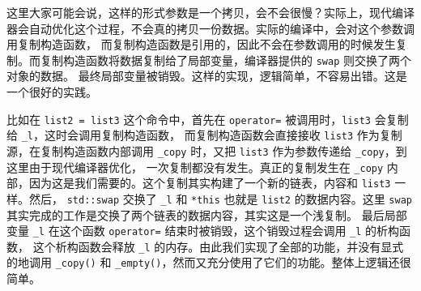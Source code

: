 \documentclass[a4paper]{ctexart}
\theoremstyle{definition}
\theoremstyle{definition}
\begin{document}
这里大家可能会说，这样的形式参数是一个拷贝，会不会很慢？实际上，现代编译器会自动优化这个过程，不会真的拷贝一份数据。实际的编译中，会对这个参数调用复制构造函数，
而复制构造函数是引用的，因此不会在参数调用的时候发生复制。而复制构造函数将数据复制给了局部变量，编译器提供的 \verb|swap| 则交换了两个对象的数据。
最终局部变量被销毁。这样的实现，逻辑简单，不容易出错。这是一个很好的实践。

比如在 \verb|list2 = list3| 这个命令中，首先在 \verb|operator=| 被调用时，\verb|list3| 会复制给 \verb|_l|，这时会调用复制构造函数，
而复制构造函数会直接接收 \verb|list3| 作为复制源，在复制构造函数内部调用 \verb|_copy| 时，又把 \verb|list3| 作为参数传递给 \verb|_copy|，到这里由于现代编译器优化，
一次复制都没有发生。真正的复制发生在 \verb|_copy| 内部，因为这是我们需要的。这个复制其实构建了一个新的链表，内容和 \verb|list3| 一样。然后，
\verb|std::swap| 交换了 \verb|_l| 和 \verb|*this| 也就是 \verb|list2| 的数据内容。这里 \verb|swap| 其实完成的工作是交换了两个链表的数据内容，其实这是一个浅复制。
最后局部变量 \verb|_l| 在这个函数 \verb|operator=| 结束时被销毁，这个销毁过程会调用 \verb|_l| 的析构函数，
这个析构函数会释放 \verb|_l| 的内存。由此我们实现了全部的功能，并没有显式的地调用 \verb|_copy()| 和 \verb|_empty()|，然而又充分使用了它们的功能。整体上逻辑还很简单。

  
  
  
  
  
\end{document}
